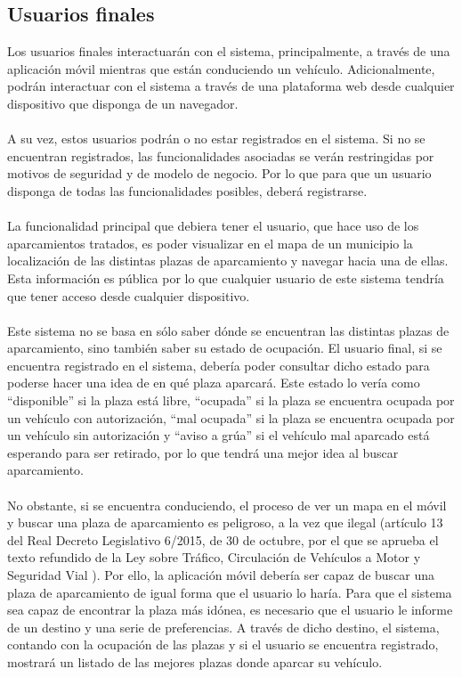 \subsection{Usuarios finales}
Los usuarios finales interactuarán con el sistema, principalmente, a través de una aplicación móvil mientras que están conduciendo un vehículo. Adicionalmente, podrán interactuar con el sistema a través de una plataforma web desde cualquier dispositivo que disponga de un navegador.
\\\\
A su vez, estos usuarios podrán o no estar registrados en el sistema. Si no se encuentran registrados, las funcionalidades asociadas se verán restringidas por motivos de seguridad y de modelo de negocio. Por lo que para que un usuario disponga de todas las funcionalidades posibles, deberá registrarse.
\\\\
La funcionalidad principal que debiera tener el usuario, que hace uso de los aparcamientos tratados, es poder visualizar en el mapa de un municipio la localización de las distintas plazas de aparcamiento y navegar hacia una de ellas. Esta información es pública por lo que cualquier usuario de este sistema tendría que tener acceso desde cualquier dispositivo.
\\\\
Este sistema no se basa en sólo saber dónde se encuentran las distintas plazas de aparcamiento, sino también saber su estado de ocupación. El usuario final, si se encuentra registrado en el sistema, debería poder consultar dicho estado para poderse hacer una idea de en qué plaza aparcará. Este estado lo vería como “disponible” si la plaza está libre, “ocupada” si la plaza se encuentra ocupada por un vehículo con autorización, “mal ocupada” si la plaza se encuentra ocupada por un vehículo sin autorización y “aviso a grúa” si el vehículo mal aparcado está esperando para ser retirado, por lo que tendrá una mejor idea al buscar aparcamiento.
\\\\
No obstante, si se encuentra conduciendo, el proceso de ver un mapa en el móvil y buscar una plaza de aparcamiento es peligroso, a la vez que ilegal (artículo 13 del Real Decreto Legislativo 6/2015, de 30 de octubre, por el que se aprueba el texto refundido de la Ley sobre Tráfico, Circulación de Vehículos a Motor y Seguridad Vial \cite{rdl6-2015}). Por ello, la aplicación móvil debería ser capaz de buscar una plaza de aparcamiento de igual forma que el usuario lo haría. Para que el sistema sea capaz de encontrar la plaza más idónea, es necesario que el usuario le informe de un destino y una serie de preferencias. A través de dicho destino, el sistema, contando con la ocupación de las plazas y si el usuario se encuentra registrado, mostrará un listado de las mejores plazas donde aparcar su vehículo.
